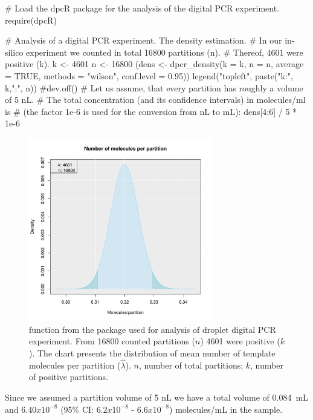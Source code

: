 \begin{example}
# Load the dpcR package for the analysis of the digital PCR experiment.
require(dpcR)

# Analysis of a digital PCR experiment. The density estimation.
# In our in-silico experiment we counted in total 16800 partitions (n). 
# Thereof, 4601 were positive (k).
k <- 4601
n <- 16800
(dens <- dpcr_density(k = k, n = n, average = TRUE, methods = "wilson", 
                      conf.level = 0.95))
legend("topleft", paste("k:", k,"\nn:", n))
#dev.off()
# Let us assume, that every partition has roughly a volume of 5 nL.
# The total concentration (and its confidence intervals) in molecules/ml is
# (the factor 1e-6 is used for the conversion from nL to mL):
dens[4:6] / 5 * 1e-6
\end{example}

\begin{figure}[htbp]
  \centering
  \includegraphics[clip=true, trim=0.15cm 0.55cm 1cm 1.8cm, width=8cm]{figures/dpcR.pdf}
  \caption{ function from the  package used 
for analysis of droplet digital PCR experiment. From 16800 counted partitions 
($n$) 4601 were positive ($k$). The chart presents the distribution of mean 
number of template molecules per partition ($\hat \lambda$). $n$, number of 
total partitions; $k$, number of positive partitions.
}
  \label{figure:dpcR}
\end{figure}

Since we assumed a partition volume of 5 nL we have a total volume of 0.084~mL 
and $6.40 x 10^{-8}$ (95\% CI: $6.2 x 10^{-8}$ - $6.6 x 10^{-8}$) molecules/mL in the 
sample.

